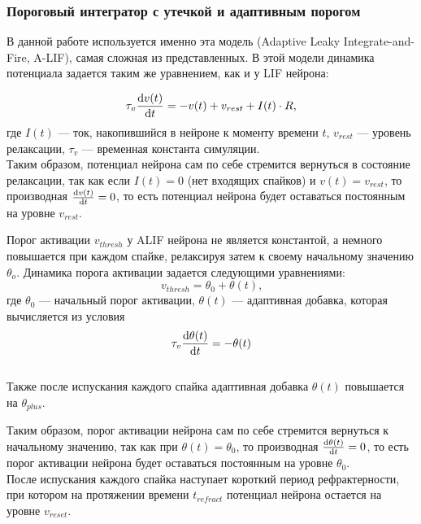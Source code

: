 \documentclass[a4paper]{article}
\begin{document}
\subsubsection{Пороговый интегратор с утечкой и адаптивным порогом}
В данной работе используется именно эта модель (Adaptive Leaky Integrate-and-Fire, A-LIF), самая сложная из представленных. В этой модели динамика потенциала задается таким же уравнением, как и у LIF нейрона:

\begin{equation} \label{eq:alif}
 \tau_v \dv{v(t)}{t} = -v(t) + v_{rest} + I(t) \cdot R \text{,}
\end{equation} где $I(t)$ --- ток, накопившийся в нейроне к моменту времени $t$, $v_{rest}$ --- уровень релаксации, $\tau_v$ --- временная константа симуляции.\\ 

Таким образом, потенциал нейрона сам по себе стремится вернуться в состояние релаксации, так как если $I(t) = 0$ (нет входящих спайков) и $v(t) = v_{rest}$, то производная $\dv{v(t)}{t} = 0$, то есть потенциал нейрона будет оставаться постоянным на уровне $v_{rest}$. 

Порог активации $v_{thresh}$ у ALIF нейрона не является константой, а немного повышается при каждом спайке, релаксируя затем к своему начальному значению $\theta_o$. Динамика порога активации задается следующими уравнениями:
\begin{equation} 
 v_{thresh} = \theta_0 + \theta(t) \text{,}
\end{equation} где $\theta_0$ --- начальный порог активации, $\theta(t)$ --- адаптивная добавка, которая вычисляется из условия\\

\begin{equation}
 \tau_v \dv{\theta(t)}{t} = -\theta(t)
\end{equation}\\

Также после испускания каждого спайка адаптивная добавка $\theta(t)$ повышается на $\theta_{plus}$.

Таким образом, порог активации нейрона сам по себе стремится вернуться к начальному значению, так как при $\theta(t) = \theta_0$, то производная $\dv{\theta(t)}{t} = 0$, то есть порог активации нейрона будет оставаться постоянным на уровне $\theta_0$.\\

После испускания каждого спайка наступает короткий период рефрактерности, при котором на протяжении времени $t_{refract}$ потенциал нейрона остается на уровне $v_{reset}$.
\end{document}
